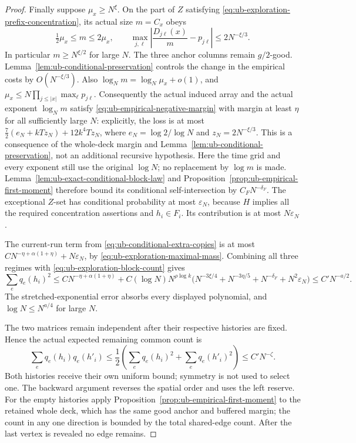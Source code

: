 \documentclass[11pt]{article}
\numberwithin{equation}{section}
\newcommand{\1}{\mathbf 1}
\begin{document}
\begin{proof}
Finally suppose \(\mu_x\ge N^\xi\). On the part of \(Z\)
satisfying \eqref{eq:ub-exploration-prefix-concentration}, its actual
size \(m=C_x\) obeys
\[
 \tfrac12\mu_x\le m\le2\mu_x,\qquad
 \max_{j,\ell}\left|\frac{D_{j\ell}(x)}m-p_{j\ell}\right|
 \le2N^{-\xi/3}.
\]
In particular \(m\ge N^{\xi/2}\) for large \(N\). The three
anchor columns remain \(g/2\)-good. Lemma~\ref{lem:ub-conditional-preservation} controls the change
in the empirical costs by \(O(N^{-\xi/3})\). Also
\(\log_Nm=\log_N\mu_x+o(1)\), and
\(\mu_x\le N\prod_{j\le|x|}\max_\ell p_{j\ell}\).
Consequently the actual induced array and the actual exponent
\(\log_Nm\) satisfy \eqref{eq:ub-empirical-negative-margin} with margin
at least $\eta$ for all sufficiently large $N$: explicitly, the
loss is at most $\frac72(e_N+kTz_N)+12k^4Tz_N$, where
$e_N=\log2/\log N$ and $z_N=2N^{-\xi/3}$. This is a
consequence of the whole-deck margin and
Lemma~\ref{lem:ub-conditional-preservation}, not an additional
recursive hypothesis.
Here the time grid and every exponent still use the original
\(\log N\); no replacement by \(\log m\) is made.
Lemma~\ref{lem:ub-exact-conditional-block-law} and
Proposition~\ref{prop:ub-empirical-first-moment} therefore bound
its conditional self-intersection by \(C_FN^{-\delta_F}\).
The exceptional \(Z\)-set has conditional probability at most
\(\varepsilon_N\), because \(H\) implies all the required
concentration assertions and \(h_i\in F_i\). Its contribution
is at most \(N\varepsilon_N\).

The current-run term from
\eqref{eq:ub-conditional-extra-copies} is at most
\(C N^{-\eta+\alpha(1+\eta)}+N\varepsilon_N\), by
\eqref{eq:ub-exploration-maximal-mass}. Combining all three regimes
with \eqref{eq:ub-exploration-block-count} gives
\[
 \sum_e q_e(h_i)^2
 \le C N^{-\eta+\alpha(1+\eta)}
 +C(\log N)N^{\rho\log k}
   \bigl(N^{-3\xi/4}+N^{-3\eta/5}+N^{-\delta_F}
                            +N^2\varepsilon_N\bigr)
 \le C'N^{-a/2}.
\]
The stretched-exponential error absorbs every displayed polynomial,
and \(\log N\le N^{a/4}\) for large \(N\).

The two matrices remain independent after their respective histories
are fixed. Hence the actual expected remaining common count is
\[
 \sum_e q_e(h_i)q_e(h'_i)
 \le\frac12\left(\sum_e q_e(h_i)^2+
                         \sum_e q_e(h'_i)^2\right)
 \le C'N^{-\zeta}.
\]
Both histories receive their own uniform bound; symmetry is not
used to select one. The backward argument reverses the spatial
order and uses the left reserve. For the empty histories apply
Proposition~\ref{prop:ub-empirical-first-moment} to the retained
whole deck, which has the same good anchor and buffered margin;
the count in any one direction is bounded by the total shared-edge
count. After the last vertex is revealed no edge remains.
\end{proof}
\end{document}

